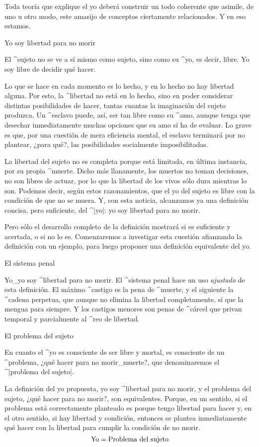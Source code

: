 Toda teoría que explique el yo deberá construir un todo coherente que
asimile, de uno u otro modo, este amasijo de conceptos ciertamente
relacionados. Y en eso estamos.


\Section Yo soy libertad para no morir

El ^{sujeto} no se ve a sí mismo como sujeto, sino como su ^{yo}, es
decir, libre. Yo soy libre de decidir qué hacer.

Lo que se hace en cada momento es lo hecho, y en lo hecho no hay
libertad alguna. Por esto, la ^{libertad} no está en lo hecho, sino en
poder considerar distintas posibilidades de hacer, tantas cuantas la
imaginación del sujeto produzca. Un ^{esclavo} puede, así, ser tan libre
como su ^{amo}, aunque tenga que desechar inmediatamente muchas opciones
que su amo sí ha de evaluar. Lo grave es que, por una cuestión de mera
eficiencia mental, el esclavo terminará por no plantear, ¿para qué?, las
posibilidades socialmente imposibilitadas.

La libertad del sujeto no es completa porque está limitada, en última
instancia, por su propia ^{muerte}. Dicho más llanamente, los muertos no
toman decisiones, no son libres de actuar, por lo que la libertad de los
vivos sólo dura mientras lo son. Podemos decir, según estos
razonamientos, que el yo del sujeto es libre con la condición de que no
se muera. Y, con esta noticia, alcanzamos ya una definición concisa,
pero suficiente, del ^|yo|: yo soy libertad para no morir.

Pero sólo el desarrollo completo de la definición mostrará si es
suficiente y acertada, o si no lo es. Comenzaremos a investigar esta
cuestión afianzando la definición con un ejemplo, para luego proponer
una definición equivalente del yo.


\Section El sistema penal

Yo_{yo} soy ^{libertad} para no morir. El ^{sistema penal} hace un uso
{\em ajustado} de esta definición. El máximo ^{castigo} es la pena de
^{muerte}, y el siguiente la ^{cadena perpetua}, que aunque no elimina
la libertad completamente, sí que la mengua para siempre. Y los castigos
menores son penas de ^{cárcel} que privan temporal y parcialmente al
^{reo} de libertad.


\Section El problema del sujeto

En cuanto el ^{yo} es consciente de ser libre y mortal, es consciente de
un ^{problema}, ¿qué hacer para no morir_{muerte}?, que denominaremos el
^|problema del sujeto|.

La definición del yo propuesta, yo soy ^{libertad} para no morir, y el
problema del sujeto, ¿qué hacer para no morir?, son equivalentes.
Porque, en un sentido, si el problema está correctamente planteado es
porque tengo libertad para hacer y, en el otro sentido, si hay libertad
y condición, entonces se plantea inmediatamente qué hacer con la
libertad para cumplir la condición de no morir. $$\hbox{Yo} =
\hbox{Problema del sujeto}$$

